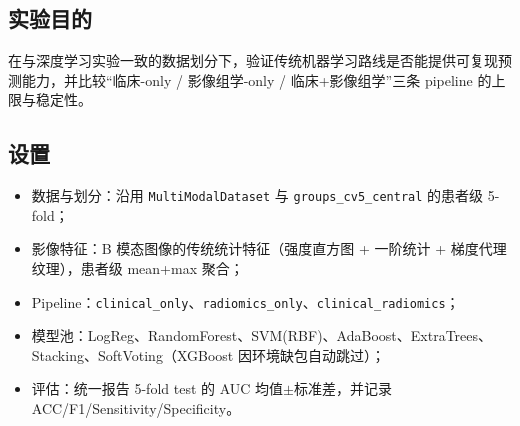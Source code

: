 \documentclass[12pt,a4paper]{ctexart}
\begin{document}
\subsection{实验目的}
在与深度学习实验一致的数据划分下，验证传统机器学习路线是否能提供可复现预测能力，并比较“临床-only / 影像组学-only / 临床+影像组学”三条 pipeline 的上限与稳定性。

\subsection{设置}
\begin{itemize}
  \item 数据与划分：沿用 \texttt{MultiModalDataset} 与 \texttt{groups\_cv5\_central} 的患者级 5-fold；
  \item 影像特征：B 模态图像的传统统计特征（强度直方图 + 一阶统计 + 梯度代理纹理），患者级 mean+max 聚合；
  \item Pipeline：\texttt{clinical\_only}、\texttt{radiomics\_only}、\texttt{clinical\_radiomics}；
  \item 模型池：LogReg、RandomForest、SVM(RBF)、AdaBoost、ExtraTrees、Stacking、SoftVoting（XGBoost 因环境缺包自动跳过）；
  \item 评估：统一报告 5-fold test 的 AUC 均值$\pm$标准差，并记录 ACC/F1/Sensitivity/Specificity。
\end{itemize}
\end{document}
